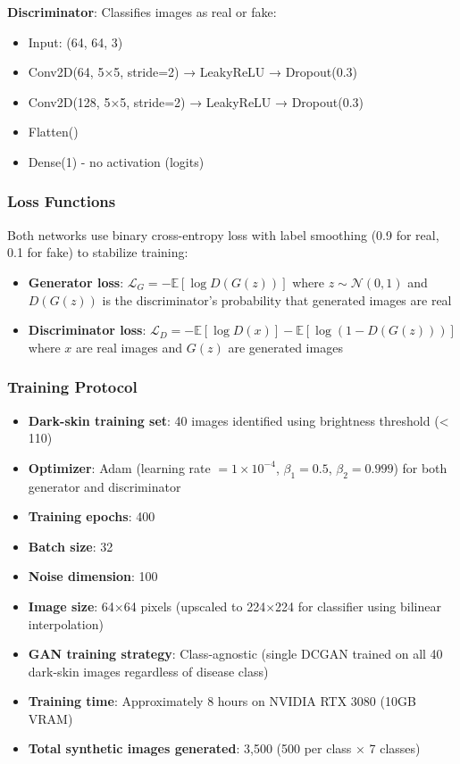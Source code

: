 \documentclass[10pt, twocolumn, letterpaper]{article}
\begin{document}
\textbf{Discriminator}: Classifies images as real or fake:
\begin{itemize}[leftmargin=*, itemsep=2pt]
    \item Input: (64, 64, 3)
    \item Conv2D(64, 5×5, stride=2) → LeakyReLU → Dropout(0.3)
    \item Conv2D(128, 5×5, stride=2) → LeakyReLU → Dropout(0.3)
    \item Flatten()
    \item Dense(1) - no activation (logits)
\end{itemize}

\subsubsection{Loss Functions}
Both networks use binary cross-entropy loss with label smoothing (0.9 for real, 0.1 for fake) to stabilize training:
\begin{itemize}[leftmargin=*, itemsep=2pt]
    \item \textbf{Generator loss}: $\mathcal{L}_G = -\mathbb{E}[\log D(G(z))]$ where $z \sim \mathcal{N}(0,1)$ and $D(G(z))$ is the discriminator's probability that generated images are real
    \item \textbf{Discriminator loss}: $\mathcal{L}_D = -\mathbb{E}[\log D(x)] - \mathbb{E}[\log(1-D(G(z)))]$ where $x$ are real images and $G(z)$ are generated images
\end{itemize}

\subsubsection{Training Protocol}
\begin{itemize}[leftmargin=*, itemsep=2pt]
    \item \textbf{Dark-skin training set}: 40 images identified using brightness threshold (< 110)
    \item \textbf{Optimizer}: Adam (learning rate $= 1 \times 10^{-4}$, $\beta_1 = 0.5$, $\beta_2 = 0.999$) for both generator and discriminator
    \item \textbf{Training epochs}: 400
    \item \textbf{Batch size}: 32
    \item \textbf{Noise dimension}: 100
    \item \textbf{Image size}: 64×64 pixels (upscaled to 224×224 for classifier using bilinear interpolation)
    \item \textbf{GAN training strategy}: Class-agnostic (single DCGAN trained on all 40 dark-skin images regardless of disease class)
    \item \textbf{Training time}: Approximately 8 hours on NVIDIA RTX 3080 (10GB VRAM)
    \item \textbf{Total synthetic images generated}: 3,500 (500 per class × 7 classes)
\end{itemize}
\end{document}
